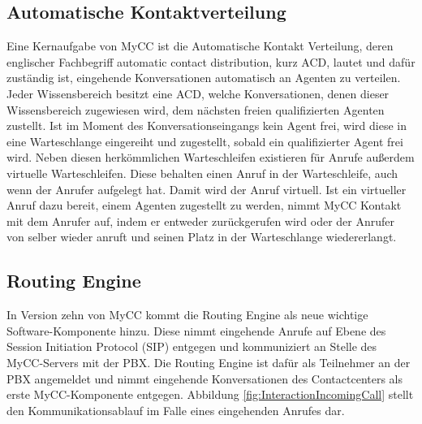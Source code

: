 \newpage

\subsection{Automatische Kontaktverteilung}
\label{subsec:Automatische Kontaktverteilung}
Eine Kernaufgabe von MyCC ist die Automatische Kontakt Verteilung, deren englischer Fachbegriff automatic contact distribution, kurz ACD, lautet und dafür zuständig ist, eingehende Konversationen automatisch an Agenten zu verteilen. Jeder Wissensbereich besitzt eine ACD, welche Konversationen, denen dieser Wissensbereich zugewiesen wird, dem nächsten freien qualifizierten Agenten zustellt. Ist im Moment des Konversationseingangs kein Agent frei, wird diese in eine Warteschlange eingereiht und zugestellt, sobald ein qualifizierter Agent frei wird. Neben diesen herkömmlichen Warteschleifen existieren für Anrufe außerdem virtuelle Warteschleifen. Diese behalten einen Anruf in der Warteschleife, auch wenn der Anrufer aufgelegt hat. Damit wird der Anruf virtuell. Ist ein virtueller Anruf dazu bereit, einem Agenten zugestellt zu werden, nimmt MyCC Kontakt mit dem Anrufer auf, indem er entweder zurückgerufen wird oder der Anrufer von selber wieder anruft und seinen Platz in der Warteschlange wiedererlangt.

\subsection{Routing Engine}
\label{subsec:Routing Engine}
In Version zehn von MyCC kommt die Routing Engine als neue wichtige Software-Komponente hinzu. Diese nimmt eingehende Anrufe auf Ebene des Session Initiation Protocol (SIP) entgegen und kommuniziert an Stelle des MyCC-Servers mit der PBX. Die Routing Engine ist dafür als Teilnehmer an der PBX angemeldet und nimmt eingehende Konversationen des Contactcenters als erste MyCC-Komponente entgegen. Abbildung \ref{fig:InteractionIncomingCall} stellt den Kommunikationsablauf im Falle eines eingehenden Anrufes dar. 

